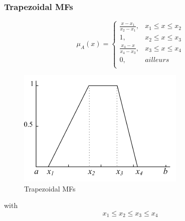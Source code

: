 \documentclass[runningheads,a4paper]{llncs}
\begin{document}
\subsubsection{Trapezoidal MFs}

\begin{equation}
\mu_{A}(x)= \left \{
\begin{array}{ll}
\frac{x - x_{1}}{x_{2} - x_{1}},& x_{1} \leq x \leq x_{2}\\
1 , &x_{2} \leq x \leq x_{3}\\
\frac{x_{4} - x}{x_{4} - x_{3}},& x_{3} \leq x \leq x_{4}\\
0        ,& ailleurs\\	
\end{array}
\right.
\end{equation}
																																																																																																																																																																																																																																																																																																																																																												
\begin{figure}[!h] 
	\begin{center}
		\includegraphics[scale=0.95]{fig/trapese}
		\caption {Trapezoidal MFs}
		\label{trapeze}
	\end{center}
\end{figure}  


with
\begin{equation}
x_{1} \leq x_{2} \leq x_{3} \leq x_{4}
\end{equation}
\end{document}
